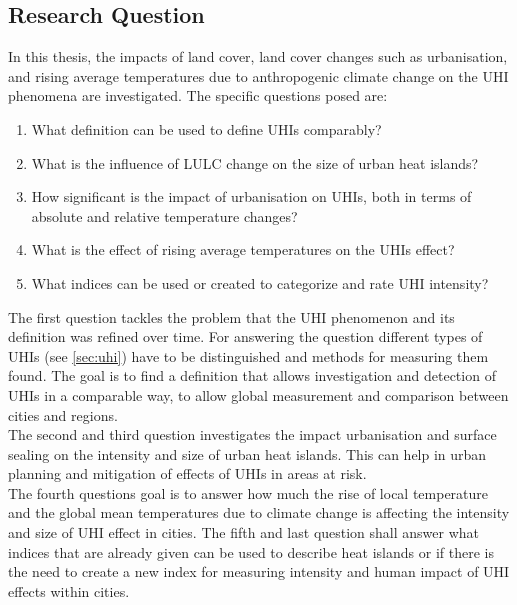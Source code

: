 \documentclass[12pt,a4paper, english,twoside]{scrartcl}
\begin{document}
 \subsection{Research Question}
  In this thesis, the impacts of land cover, land cover changes such as urbanisation, and rising average temperatures due to anthropogenic climate change on the \gls{UHI} phenomena are investigated.
  The specific questions posed are:
  \begin{enumerate}
    \item What definition can be used to define \glspl{UHI} comparably?\label{q1}
    \item What is the influence of \gls{LULC} change on the size of urban heat islands?\label{q2}
    \item How significant is the impact of urbanisation on \glspl{UHI}, both in terms of absolute and relative temperature changes?\label{q3}
    \item What is the effect of rising average temperatures on the \glspl{UHI} effect?\label{q4}
    \item What indices can be used or created to categorize and rate \gls{UHI} intensity?\label{q5}
  \end{enumerate}
  The first question tackles the problem that the \gls{UHI} phenomenon and its definition was refined over time. 
  For answering the question different types of \glspl{UHI} (see \cref{sec:uhi}) have to be distinguished and methods for measuring them found. 
  The goal is to find a definition that allows investigation and detection of \glspl{UHI} in a comparable way, to allow global measurement and comparison between cities and regions.\\ 
  The second and third question investigates the impact urbanisation and surface sealing on the intensity and size of urban heat islands. 
  This can help in urban planning and mitigation of effects of \glspl{UHI} in areas at risk.\\ 
  The fourth questions goal is to answer how much the rise of local temperature and the global mean temperatures due to climate change is affecting the intensity and size of \gls{UHI} effect in cities.%
  The fifth and last question shall answer what indices that are already given can be used to describe heat islands or if there is the need to create a new index for measuring intensity and human impact of \gls{UHI} effects within cities.
\end{document}
